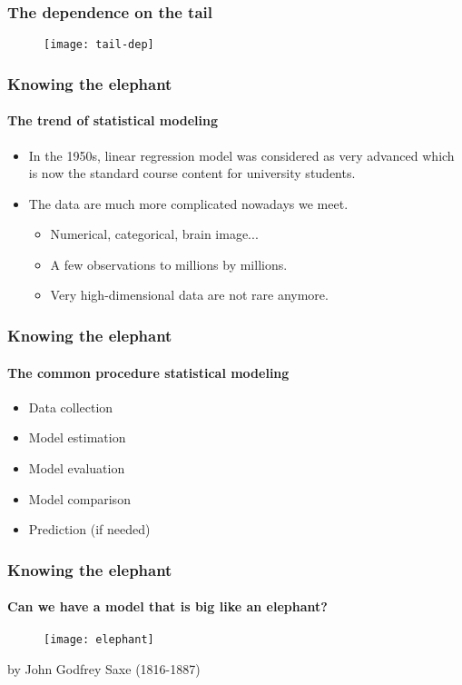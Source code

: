 \documentclass[11pt]{beamer}
\begin{document}
\begin{frame}
  \frametitle{The dependence on the tail}
      \begin{figure}
        \centering
        \texttt{[image: tail-dep]}
      \end{figure}
\end{frame}

\begin{frame}
  \frametitle{Knowing the elephant}
  \framesubtitle{The trend of statistical modeling}

  \begin{itemize}
  \item In the 1950s, linear regression model  was considered as very advanced
    which is now the standard course content for university students.
  \item The data are much more complicated nowadays we meet.
    \begin{itemize}
    \item Numerical, categorical, brain image...
    \item A few observations to millions by millions.
    \item Very high-dimensional data are not rare anymore.
    \end{itemize}
  \end{itemize}
\end{frame}



\begin{frame}
  \frametitle{Knowing the elephant}
  \framesubtitle{The common procedure statistical modeling}

  \begin{itemize}
  \item Data collection
  \item Model estimation
  \item Model evaluation
  \item Model comparison
  \item Prediction (if needed)
  \end{itemize}
\end{frame}


\begin{frame}
  \frametitle{Knowing the elephant}
  \framesubtitle{Can we have a model that is big like an elephant?}

      \begin{figure}
        \centering
        \texttt{[image: elephant]}
      \end{figure}
\tiny{by John Godfrey Saxe (1816-1887)}
\end{frame}
\end{document}
